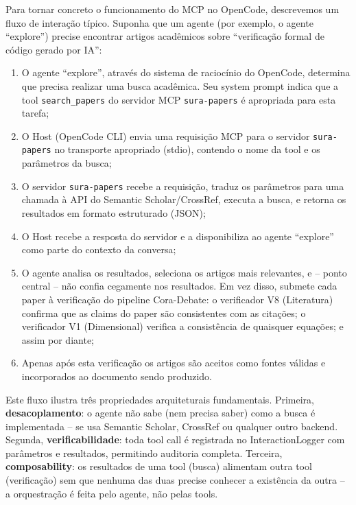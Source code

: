 \documentclass[12pt,a4paper,sumario=tradicional,openany]{abntex2}
\begin{document}
Para tornar concreto o funcionamento do MCP no OpenCode, descrevemos um fluxo de interação típico. Suponha que um agente (por exemplo, o agente ``explore'') precise encontrar artigos acadêmicos sobre ``verificação formal de código gerado por IA'':

\begin{enumerate}
    \item O agente ``explore'', através do sistema de raciocínio do OpenCode, determina que precisa realizar uma busca acadêmica. Seu system prompt indica que a tool \texttt{search\_papers} do servidor MCP \texttt{sura-papers} é apropriada para esta tarefa;
    \item O Host (OpenCode CLI) envia uma requisição MCP para o servidor
    \texttt{sura-papers} no transporte apropriado (stdio), contendo o nome da
    tool e os parâmetros da busca;
    \item O servidor \texttt{sura-papers} recebe a requisição, traduz os parâmetros para uma chamada à API do Semantic Scholar/CrossRef, executa a busca, e retorna os resultados em formato estruturado (JSON);
    \item O Host recebe a resposta do servidor e a disponibiliza ao agente ``explore'' como parte do contexto da conversa;
    \item O agente analisa os resultados, seleciona os artigos mais relevantes, e -- ponto central -- não confia cegamente nos resultados. Em vez disso, submete cada paper à verificação do pipeline Cora-Debate: o verificador V8 (Literatura) confirma que as claims do paper são consistentes com as citações; o verificador V1 (Dimensional) verifica a consistência de quaisquer equações; e assim por diante;
    \item Apenas após esta verificação os artigos são aceitos como fontes válidas e incorporados ao documento sendo produzido.
\end{enumerate}

Este fluxo ilustra três propriedades arquiteturais fundamentais. Primeira, \textbf{desacoplamento}: o agente não sabe (nem precisa saber) como a busca é implementada -- se usa Semantic Scholar, CrossRef ou qualquer outro backend. Segunda, \textbf{verificabilidade}: toda tool call é registrada no InteractionLogger com parâmetros e resultados, permitindo auditoria completa. Terceira, \textbf{composability}: os resultados de uma tool (busca) alimentam outra tool (verificação) sem que nenhuma das duas precise conhecer a existência da outra -- a orquestração é feita pelo agente, não pelas tools.
\end{document}
